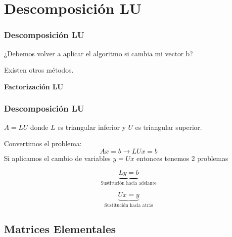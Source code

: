 \documentclass[xcolor=svgnames]{beamer} %
\theoremstyle{plain}
\renewcommand{\textbf}[1]{{\bfseries\textcolor{redUnq2}{#1}}}
\theoremstyle{definition}
\begin{document}
\section{Descomposición LU}

\begin{frame}
\frametitle{Descomposición LU}
¿Debemos volver a aplicar el algoritmo si cambia mi vector b? 

Existen otros métodos.

\pause
\textbf{Factorización LU}
\end{frame}

\begin{frame}
\frametitle{Descomposición LU}
$A = L U $ donde $L$ es triangular inferior y $ U$ es triangular superior.

Convertimos el problema:
$$ A x = b \rightarrow L U x = b$$ 
Si aplicamos el cambio de variables $ y = U x $ entonces tenemos 2 problemas 

\begin{minipage}{.45\linewidth}
\begin{equation}
 \underbrace{L y = b}_{\text{Sustitución hacia adelante}}
\end{equation}
\end{minipage}  \begin{minipage}{.45\linewidth}
\begin{equation}
\underbrace{ U x = y}_{\text{Sustitución hacia atrás}}
\end{equation} \end{minipage}

\end{frame}

\subsection{Matrices Elementales}
\end{document}
